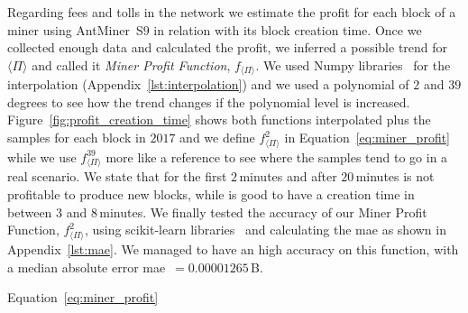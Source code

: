 \documentclass[USenglish]{uit-thesis}
\def\bitcoin{\leavevmode\rlap{\hskip.5pt-}B}
\begin{document}
Regarding fees and tolls in the network
we estimate the profit for each block
of a miner using AntMiner~S$9$
in relation with its block creation time.
Once we collected enough data and calculated
the profit, we inferred a possible trend for
$\langle \Pi \rangle$ and called it \emph{Miner Profit Function},
$f_{\langle \Pi \rangle}$. We used Numpy libraries~\cite{scipy}
for the interpolation (Appendix~\ref{lst:interpolation})
and we used a polynomial of
$2$ and $39$ degrees to see how the trend
changes if the polynomial level is increased.
Figure~\ref{fig:profit_creation_time} shows
both functions interpolated plus the samples
for each block in $2017$ and we define
$f^2_{\langle \Pi \rangle}$
in Equation~\ref{eq:miner_profit} while
we use $f^{39}_{\langle \Pi \rangle}$ more
like a reference to see where the samples
tend to go in a real scenario. We state
that for the first $2$\,minutes
and after $20$\,minutes
is not profitable to produce new
blocks, while is good to have a creation
time in between $3$ and $8$\,minutes.
We finally tested the accuracy of our
Miner Profit Function, $f^2_{\langle \Pi \rangle}$,
using scikit-learn libraries~\cite{scikit-learn}
and calculating the \gls{mae} as shown in
Appendix~\ref{lst:mae}. We managed to have an
high accuracy on this function, with a median
absolute error \gls{mae}~$= 0.00001265$\,\bitcoin.


Equation~\ref{eq:miner_profit}




\end{document}
